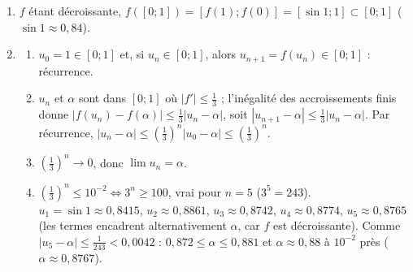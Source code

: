 \begin{corrige}
\begin{sol}
\begin{description}
\begin{enumerate}
            Pour $x \in ]0 ; 1]$, $f(x) = x \iff \sin x = x^2$ ; comme $0$ n'est pas solution de $f(x) = x$, $\alpha$ est l'unique solution
            de $\sin x = x^2$ dans $]0 ; 1]$.
      \item $f$ \'etant d\'ecroissante, $f([0 ; 1]) = [f(1) ; f(0)] = [\sin 1 ; 1] \subset [0 ; 1]$ ($\sin 1 \approx 0{,}84$).
      \item \begin{enumerate}
            \item $u_0 = 1 \in [0 ; 1]$ et, si $u_n \in [0 ; 1]$, alors $u_{n+1} = f(u_n) \in [0 ; 1]$ : r\'ecurrence.
            \item $u_n$ et $\alpha$ sont dans $[0 ; 1]$ o\`u $|f'| \leq \frac{1}{3}$ ; l'in\'egalit\'e des accroissements finis donne
                  $|f(u_n) - f(\alpha)| \leq \frac{1}{3}|u_n - \alpha|$, soit $|u_{n+1} - \alpha| \leq \frac{1}{3}|u_n - \alpha|$.
                  Par r\'ecurrence, $|u_n - \alpha| \leq \left( \frac{1}{3} \right)^n |u_0 - \alpha| \leq \left( \frac{1}{3} \right)^n$.
            \item $\left( \frac{1}{3} \right)^n \to 0$, donc $\boxed{\lim u_n = \alpha}$.
            \item $\left( \frac{1}{3} \right)^n \leq 10^{-2} \iff 3^n \geq 100$, vrai pour $n = 5$ ($3^5 = 243$).
                  $u_1 = \sin 1 \approx 0{,}8415$, $u_2 \approx 0{,}8861$, $u_3 \approx 0{,}8742$, $u_4 \approx 0{,}8774$,
                  $u_5 \approx 0{,}8765$ (les termes encadrent alternativement $\alpha$, car $f$ est d\'ecroissante).
                  Comme $|u_5 - \alpha| \leq \frac{1}{243} < 0{,}0042$ : $0{,}872 \leq \alpha \leq 0{,}881$ et $\boxed{\alpha \approx 0{,}88}$
                  \`a $10^{-2}$ pr\`es ($\alpha \approx 0{,}8767$).
            \end{enumerate}
      \end{enumerate}
\end{description}
\end{sol}


\end{corrige}
